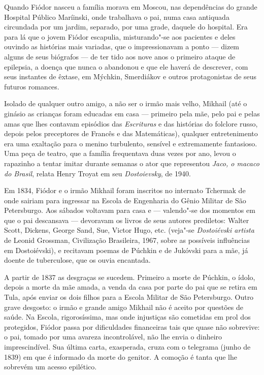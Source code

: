Quando Fiódor nasceu a família morava em Moscou, nas dependências do
grande Hospital Público Maríinski, onde trabalhava o pai, numa casa
antiquada circundada por um jardim, separado, por uma grade, daquele do
hospital. Era para lá que o jovem Fiódor escapulia, misturando"-se aos
pacientes e deles ouvindo as histórias mais variadas, que o
impressionavam a ponto --- dizem alguns de seus biógrafos --- de ter tido
aos nove anos o primeiro ataque de epilepsia, a doença que nunca o
abandonou e que ele haverá de descrever, com seus instantes de êxtase,
em Mýchkin, Smerdiákov e outros protagonistas de seus futuros romances.

Isolado de qualquer outro amigo, a não ser o irmão mais velho, Mikhail
(até o ginásio as crianças foram educadas em casa --- primeiro pela mãe,
pelo pai e pelas amas que lhes contavam episódios das \emph{Escrituras} e das
histórias do folclore russo, depois pelos preceptores de Francês e das
Matemáticas), qualquer entretenimento era uma exaltação para o menino
turbulento, sensível e extremamente fantasioso. Uma peça de teatro, que
a família frequentava duas vezes por ano, levou o rapazinho a tentar
imitar durante semanas o ator que representou \emph{Jaco, o macaco do
Brasil}, relata Henry Troyat em seu \emph{Dostoievsky}, de 1940.

Em 1834, Fiódor e o irmão Mikhail foram inscritos no internato Tchermak
de onde sairiam para ingressar na Escola de Engenharia do Gênio Militar
de São Petersburgo. Aos sábados voltavam para casa e --- valendo"-se dos
momentos em que o pai descansava --- devoravam os livros de seus autores
prediletos: Walter Scott, Dickens, George Sand, Sue, Victor Hugo, etc.
(veja"-se \emph{Dostoiévski artista} de Leonid Grossman, Civilização Brasileira, 1967, sobre as
possíveis influências em Dostoiévski), e recitavam poemas de Púchkin e
de Jukóvski para a mãe, já doente de tuberculose, que os ouvia
encantada.

A partir de 1837 as desgraças se sucedem. Primeiro a morte de Púchkin, o
ídolo, depois a morte da mãe amada, a venda da casa por parte do pai que
se retira em Tula, após enviar os dois filhos para a Escola Militar de
São Petersburgo. Outro grave desgosto: o irmão e grande amigo Mikhail
não é aceito por questões de saúde. Na Escola, rigorosíssima, mas onde
injustiças são cometidas em prol dos protegidos, Fiódor passa por
dificuldades financeiras tais que quase não sobrevive: o pai, tomado por
uma avareza incontrolável, não lhe envia o dinheiro imprescindível. Sua
última carta, exasperada, cruza com o telegrama (junho de 1839) em que é
informado da morte do genitor. A comoção é tanta que lhe sobrevém um
acesso epilético.


